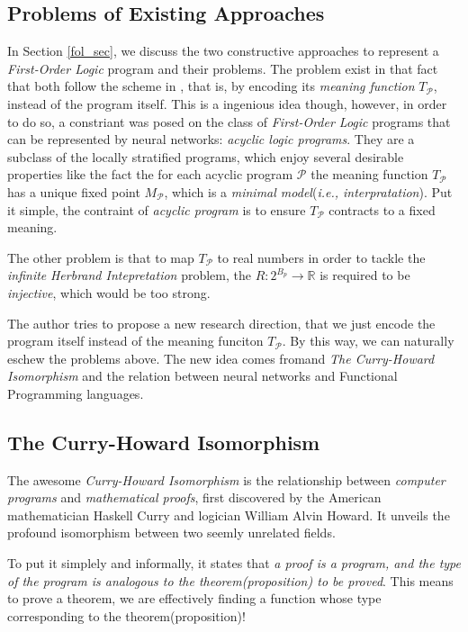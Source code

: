 \documentclass[letterpaper,10pt]{article}
\theoremstyle{definition}
\begin{document}
\subsection{Problems of Existing Approaches}

In Section \ref{fol_sec}, we discuss the two constructive approaches to represent a \emph{First-Order Logic} program and their problems. The problem exist in that fact that both follow the scheme in \cite{holldobler1999approximating}, that is, by encoding its \emph{meaning function} $T_{\mathcal{P}}$, instead of the program itself. This is a ingenious idea though, however, in order to do so, a constriant was posed on the class of  \emph{First-Order Logic} programs that can be represented by neural networks:  \emph{acyclic logic programs}\cite{apt1991acyclic}.  They are a subclass of the locally stratified programs, which enjoy several desirable properties like the fact the for each acyclic program $\mathcal{P}$ the meaning function $T_{\mathcal{P}}$ has a unique fixed point $M_{\mathcal{P}}$,  which is a \emph{minimal model}(\emph{i.e., interpratation}). Put it simple, the contraint of \emph{acyclic program} is to ensure $T_{\mathcal{P}}$ contracts to a fixed meaning.

The other problem is that to map $T_{\mathcal{P}}$ to real numbers in order to tackle the \emph{infinite} \emph{Herbrand Intepretation} problem,  the $R: 2^{B_p} \rightarrow \mathbb{R}$ is required to be \emph{injective}, which would be too strong.

The author tries to propose a new research direction, that we just encode the program itself instead of the meaning funciton $T_{\mathcal{P}}$. By this way, we can naturally eschew the problems above. The new idea comes fromand \emph{The Curry-Howard Isomorphism}\cite{sorensen2006lectures} and the relation between neural networks and Functional Programming languages\cite{olah2015neural}.

\subsection{The Curry-Howard Isomorphism}\label{chi_sec}

The awesome \emph{Curry-Howard Isomorphism} is the relationship between \emph{computer programs} and \emph{mathematical proofs},  first discovered by the American mathematician Haskell Curry and logician William Alvin Howard. It unveils the profound isomorphism between two seemly unrelated fields.

To put it simplely and informally, it states that \emph{a proof is a program, and the type of the program is analogous to the theorem(proposition) to be proved}. This means to prove a theorem, we are effectively finding a function whose type corresponding to the theorem(proposition)!
\end{document}
